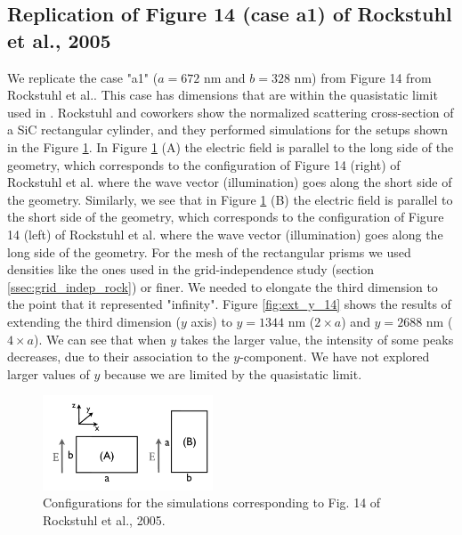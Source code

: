 \subsection{Replication of Figure 14 (case a1) of Rockstuhl et al., 2005}

We replicate the case "a1" ($a=672$ nm and $b=328$ nm) from Figure 14 from Rockstuhl et al.. This 
case has dimensions that are within the quasistatic limit used in \pygbe. Rockstuhl and coworkers show the normalized
scattering cross-section of a SiC rectangular cylinder, and they performed simulations for the setups shown in the Figure
\ref{fig:rectangle_sketch}. In Figure \ref{fig:rectangle_sketch} (A) the electric field is parallel to the long side of the geometry, which 
corresponds to the configuration of Figure 14 (right) of Rockstuhl et al. where the wave vector (illumination) goes along the short side of the geometry. 
Similarly, we see that in Figure \ref{fig:rectangle_sketch} (B) the electric field is parallel to the short side of the geometry, which 
corresponds to the configuration of Figure 14 (left) of Rockstuhl et al. where the wave vector (illumination) goes along the long side of the geometry.
For the mesh of the rectangular prisms we used densities like the ones used in the grid-independence study (section \ref{ssec:grid_indep_rock}) or finer. We 
needed to elongate the third dimension to the point that it represented "infinity". Figure \ref{fig:ext_y_14} shows the results of extending the third 
dimension ($y$ axis) to $y=1344$ nm ($2\times a$) and $y=2688$ nm ($4\times a$). We can see that when $y$ takes the larger value, the intensity of 
some peaks decreases, due to their association to the $y$-component. We have not explored larger values of $y$ because we are limited by the quasistatic limit.

 \begin{figure}
    \centering
    \includegraphics[width=0.45\textwidth]{rockstuhl_rectangles.pdf} 
    \caption{Configurations for the simulations corresponding to Fig. 14 of Rockstuhl et al., 2005.}
    \label{fig:rectangle_sketch}
\end{figure}


